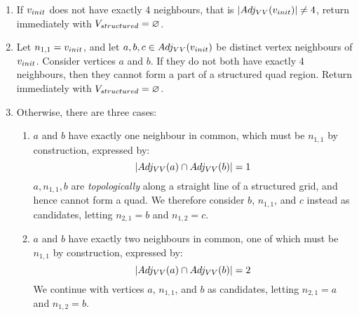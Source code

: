 \begin{enumerate}
\item If $v_{init}$ does not have exactly 4 neighbours, that is $ \left\vert{Adj_{VV}(v_{init})}\right\vert \neq 4 $, return immediately with $V_{structured} = \varnothing$.
\item Let $ n_{1,1} = v_{init} $, and let $ a, b, c \in Adj_{VV}(v_{init}) $ be distinct vertex neighbours of $v_{init}$. Consider vertices $a$ and $b$. If they do not both have exactly 4 neighbours, then they cannot form a part of a structured quad region. Return immediately with $V_{structured} = \varnothing$.

\item Otherwise, there are three cases:

	\begin{enumerate}[label=Case \alph*)]

	\item $a$ and $b$ have exactly one neighbour in common, which must be $n_{1,1}$ by construction, expressed by:
	$$ \left\vert{Adj_{VV}(a) \cap Adj_{VV}(b)}\right\vert = 1$$
	$a, n_{1,1}, b $ are \emph{topologically} along a straight line of a structured grid, and hence cannot form a quad.
	We therefore consider $b$, $n_{1,1}$, and  $c$ instead as candidates, letting $n_{2,1} = b$ and $n_{1,2} = c$.


	\item $a$ and $b$ have exactly two neighbours in common, one of which must be $n_{1,1}$ by construction, expressed by:
	$$ \left\vert{Adj_{VV}(a) \cap Adj_{VV}(b)}\right\vert = 2$$
	We continue with vertices $a$, $n_{1,1}$, and $b$ as candidates, letting $n_{2,1} = a$ and $n_{1,2} = b$.
\end{enumerate}
\end{enumerate}
